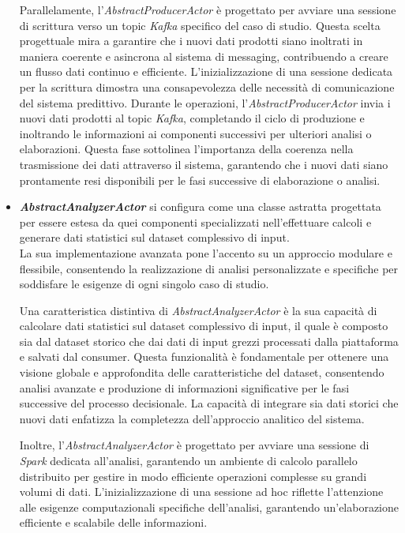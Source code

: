 \begin{itemize}
    Parallelamente, l'\textit{AbstractProducerActor} è progettato per avviare una sessione di scrittura verso un topic \textit{Kafka} specifico del caso di studio.
    Questa scelta progettuale mira a garantire che i nuovi dati prodotti siano inoltrati in maniera coerente e asincrona al sistema di messaging, contribuendo a creare un flusso dati continuo e efficiente.
    L'inizializzazione di una sessione dedicata per la scrittura dimostra una consapevolezza delle necessità di comunicazione del sistema predittivo.
    Durante le operazioni, l'\textit{AbstractProducerActor} invia i nuovi dati prodotti al topic \textit{Kafka}, completando il ciclo di produzione e inoltrando le informazioni ai componenti successivi per ulteriori analisi o elaborazioni.
    Questa fase sottolinea l'importanza della coerenza nella trasmissione dei dati attraverso il sistema, garantendo che i nuovi dati siano prontamente resi disponibili per le fasi successive di elaborazione o analisi.
    \item \textit{\textbf{AbstractAnalyzerActor}} si configura come una classe astratta progettata per essere estesa da quei componenti specializzati nell'effettuare calcoli e generare dati statistici sul dataset complessivo di input. \\
    La sua implementazione avanzata pone l'accento su un approccio modulare e flessibile, consentendo la realizzazione di analisi personalizzate e specifiche per soddisfare le esigenze di ogni singolo caso di studio.

    Una caratteristica distintiva di \textit{AbstractAnalyzerActor} è la sua capacità di calcolare dati statistici sul dataset complessivo di input, il quale è composto sia dal dataset storico che dai dati di input grezzi processati dalla piattaforma e salvati dal consumer.
    Questa funzionalità è fondamentale per ottenere una visione globale e approfondita delle caratteristiche del dataset, consentendo analisi avanzate e produzione di informazioni significative per le fasi successive del processo decisionale.
    La capacità di integrare sia dati storici che nuovi dati enfatizza la completezza dell'approccio analitico del sistema.
    
    Inoltre, l'\textit{AbstractAnalyzerActor} è progettato per avviare una sessione di \textit{Spark} dedicata all'analisi, garantendo un ambiente di calcolo parallelo distribuito per gestire in modo efficiente operazioni complesse su grandi volumi di dati.
    L'inizializzazione di una sessione ad hoc riflette l'attenzione alle esigenze computazionali specifiche dell'analisi, garantendo un'elaborazione efficiente e scalabile delle informazioni.
    

\end{itemize}
